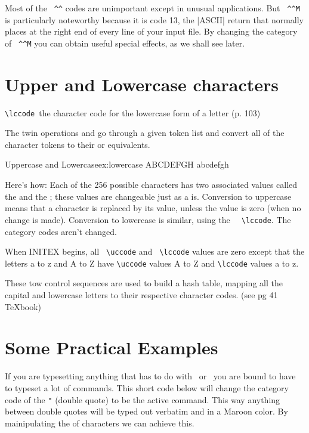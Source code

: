 Most of the \verb+ ^^+ codes are unimportant except in unusual applications. But
\verb+ ^^M+ is particularly noteworthy because it is code 13, the |ASCII| return that
\tex normally places at the right end of every line of your input file. By changing the
category of \verb+ ^^M+  you can obtain useful special effects, as we shall see later.

\section{Upper and Lowercase characters}

\verb*+\lccode +the character code for the lowercase form of a letter (p. 103)

\DescribeMacro{\lowercase}
\DescribeMacro{\uppercase}
The twin operations \cmd{\uppercase} and \cmd{\lowercase}
go through a given token list and convert all of the character tokens to their
\cmd{\uppercase}  or  equivalents.

\begin{texexample}{Uppercase and Lowercase}{ex:lowercase} 
\uppercase{abcdefgh} 
\lowercase{ABCDEFGH}
\end{texexample}

Here's how: Each of the 256 possible characters
has two associated values called the \cmd{\uccode} and the ; these values are
changeable just as a \cmd{\catcode} is. Conversion to uppercase means that a character
is replaced by its \cmd{\uccode} value, unless the \cmd{\uccode} value is zero (when no change
is made). Conversion to lowercase is similar, using the
\verb+  \lccode+. The category codes
aren't changed. 

When INITEX begins, all \verb+ \uccode+ and \verb+ \lccode+ values are zero except
that the letters a to z and A to Z have \verb+\uccode+ values A to Z and \verb+\lccode+ values a to z.

These tow control sequences are used to build a hash table, mapping all the capital and lowercase letters to their respective character codes.
(see pg 41 TeXbook)

\section{Some Practical Examples}

If you are typesetting anything that has to do with \tex\ or \latex\ you are bound to have to typeset a lot of commands. This short code below will change the category code of the \texttt{"} (double quote) to be the active command. This way anything between double quotes will be  typed out verbatim and in a Maroon color. By mainipulating the  of characters we can achieve this.

